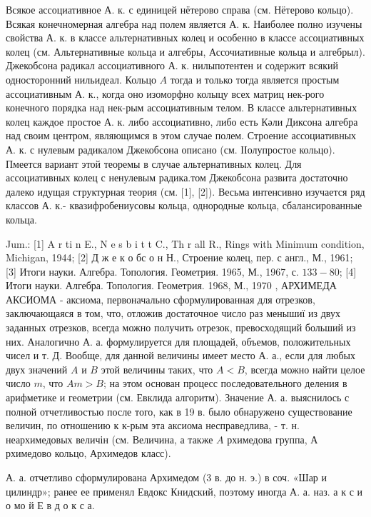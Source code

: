 \documentclass[10pt]{article}
\begin{document}
Всякое ассоциативное А. к. с единицей нётерово справа (см. Нётерово кольцо). Всякая конечномерная алгебра над полем является А. к. Наиболее полно изучены свойства А. к. в классе альтернативных колец и особенно в классе ассоциативных колец (см. Альтернативные кольца и алгебры, Ассочиативные кольца и алгебрыл). Джекобсона радикал ассоциативного А. к. нилыпотентен и содержит всякий односторонний нильидеал. Кольцо $A$ тогда и только тогда является простым ассоциативным А. к., когда оно изоморфно колыцу всех матриц нек-рого конечного порядка над нек-рым ассоциативным телом. В классе альтернативных колец каждое простое А. к. либо ассоциативно, либо есть Кәли Диксона алгебра над своим центром, являющимся в этом случае полем. Строение ассоциативных А. к. с нулевым радикалом Джекобсона описано (см. ІІолупростое кольцо). Пмеется вариант этой теоремы в случае альтернативных колец. Для ассоциативных колец с ненулевым радика.том Джекобсона развита достаточно далеко идущая структурная теория (см. [1], [2]). Весьма интенсивно изучается ряд классов А. к.- квазифробениусовы кольца, однородные кольца, сбалансированные кольца.



Jum.: [1] A r ti n E., N e s b i t t C., Th r all R., Rings with Minimum condition, Michigan, 1944; [2] Д ж е к о бс о н Н., Строение колец, пер. с англ., М., 1961; [3] Итоги науки. Алгебра. Топология. Геометрия. 1965, М., 1967, с. $133-80$; [4] Итоги науки. Алгебра. Топология. Геометрия. 1968, М., 1970 , АРХИМЕДА АКСИОМА - аксиома, первоначально сформулированная для отрезков, заключающаяся в том, что, отложив достаточное число раз менышиї из двух заданных отрезков, всегда можно получить отрезок, превосходящий больший из них. Аналогично А. а. формулируется для площадей, объемов, положительных чисел и т. Д. Вообще, для данной величины имеет место А. а., если для любых двух значений $A$ и $B$ этой величины таких, что $A<B$, всегда можно найти целое число $m$, что $A m>B$; на этом основан процесс последовательного деления в арифметике и геометрии (см. Евклида алгоритм). Значение А. а. выяснилось с полной отчетливостью после того, как в 19 в. было обнаружено существование величин, по отношению к к-рым эта аксиома несправедлива, - т. н. неархимедовых величін (см. Величина, а также $A$ рхимедова группа, А рхимедово кольцо, Архимедов класс).



А. а. отчетливо сформулирована Архимедом (3 в. до н. э.) в соч. «Шар и цилиндр»; ранее ее применял Евдокс Книдский, поэтому иногда А. а. наз. а к с и о мо й Е в д о к с а.
\end{document}
